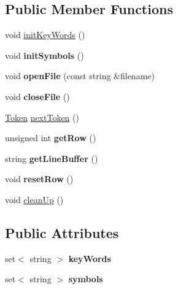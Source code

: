 \subsection*{Public Member Functions}
\begin{DoxyCompactItemize}
\item 
void \hyperlink{class_scanner_a299d27000feef9ce880a69486d6e67d2}{init\+Key\+Words} ()
\item 
\hypertarget{class_scanner_aa984b69f762727024ffa36bc6171c2c2}{}\label{class_scanner_aa984b69f762727024ffa36bc6171c2c2} 
void {\bfseries init\+Symbols} ()
\item 
\hypertarget{class_scanner_a2a0ebb604a33fae2792df2fe8e0f3354}{}\label{class_scanner_a2a0ebb604a33fae2792df2fe8e0f3354} 
void {\bfseries open\+File} (const string \&filename)
\item 
\hypertarget{class_scanner_a3cd96a9a11c56790e5c053129b9bd8ad}{}\label{class_scanner_a3cd96a9a11c56790e5c053129b9bd8ad} 
void {\bfseries close\+File} ()
\item 
\hyperlink{struct_scanner_1_1_token}{Token} \hyperlink{class_scanner_aa0d88db9dafa491ffaf1c0ae92357f20}{next\+Token} ()
\item 
\hypertarget{class_scanner_a0742be27da7d62b413b6214f8a8b1621}{}\label{class_scanner_a0742be27da7d62b413b6214f8a8b1621} 
unsigned int {\bfseries get\+Row} ()
\item 
\hypertarget{class_scanner_ac8a97e1e2bd21cf929c99f498842dad5}{}\label{class_scanner_ac8a97e1e2bd21cf929c99f498842dad5} 
string {\bfseries get\+Line\+Buffer} ()
\item 
\hypertarget{class_scanner_a70814f701d44836c2b6e1ca704ce1bb3}{}\label{class_scanner_a70814f701d44836c2b6e1ca704ce1bb3} 
void {\bfseries reset\+Row} ()
\item 
void \hyperlink{class_scanner_a377ef4e058992b4083bd835f30e113aa}{clean\+Up} ()
\end{DoxyCompactItemize}
\subsection*{Public Attributes}
\begin{DoxyCompactItemize}
\item 
\hypertarget{class_scanner_abef0898a8940e74a01194f3f249641c9}{}\label{class_scanner_abef0898a8940e74a01194f3f249641c9} 
set$<$ string $>$ {\bfseries key\+Words}
\item 
\hypertarget{class_scanner_ae575d45434a167e925691c6fca90805b}{}\label{class_scanner_ae575d45434a167e925691c6fca90805b} 
set$<$ string $>$ {\bfseries symbols}
\end{DoxyCompactItemize}


